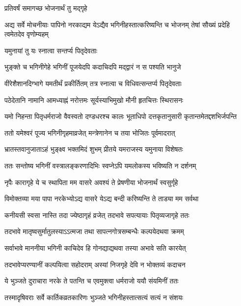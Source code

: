 
\onelineshloka
{प्रतिवर्षं समागच्छ भोजनार्थं तु मद्गृहे} %

\threelineshloka
{अद्य सर्वे मोचनीयाः पापिनो नरकाद्यम}
{येऽद्यैव भगिनीहस्तात्करिष्यन्ति च भोजनम्}
{तेषां सौख्यं प्रदेहि त्वमेतदेव वृणोम्यहम्} %



\onelineshloka
{यमुनायां तु यः स्नात्वा सन्तर्प्य पितृदेवताः} %

\twolineshloka
{भुङ्क्ते च भगिनीगेहे भगिनीं पूजयेदपि}
{कदाचिदपि मद्द्वारं न स पश्यति भानुजे} %

\twolineshloka
{वीरेशैशानदिग्भागे यमतीर्थं प्रकीर्तितम्}
{तत्र स्नात्वा च विधिवत्सन्तर्प्य पितृदेवताः} %

\twolineshloka
{पठेदेतानि नामानि आमध्याह्नं नरोत्तमः}
{सूर्यस्याभिमुखो मौनी हृतचित्तः स्थिरासनः} %

\fourlineindentedshloka
{यमो निहन्ता पितृधर्मराजो}
{वैवस्वतो दण्डधरश्च कालः}
{भूताधिपो दत्तकृतानुसारी}
{कृतान्तमेतद्दशभिर्जपन्ति} %

\twolineshloka
{ततो यमेश्वरं पूज्य भगिनीगृहमाव्रजेत्}
{मन्त्रेणानेन च तया भोजितः पूर्वमादरात्} %

\twolineshloka
{भ्रातस्तवानुजाताऽहं भुङ्क्ष्व भक्तमिदं शुभम्}
{प्रीतये यमराजस्य यमुनाया विशेषतः} %

\twolineshloka
{ततः सन्तोष्य भगिनीं वस्त्रालङ्करणादिभिः}
{स्वप्नेऽपि यमलोकस्य भविष्यति न दर्शनम्} %

\twolineshloka
{नृपैः कारागृहे ये च स्थापिता मम वासरे}
{अवश्यं ते प्रेषणीया भोजनार्थं स्वसुर्गृहे} %

\twolineshloka
{विमोक्तव्या मया पापा नरकेभ्योऽद्य वासरे}
{येऽद्य बन्दी करिष्यन्ति ते ताड्या मम सर्वथा} %

\twolineshloka
{कनीयसी स्वसा नास्ति तदा ज्येष्ठागृहं व्रजेत्}
{तदभावे सपत्यायाः पितृव्यजागृहे ततः} %

\twolineshloka
{तदभावे मातृष्वसुर्मातुलस्याऽऽत्मजा तथा}
{सापत्नगोत्रसम्बन्धैः कल्पयेदथवा क्रमम्} %

\twolineshloka
{सर्वाभावे माननीया भगिनी काचिदेव हि}
{गोनद्याद्यथवा तस्या अभावे सति कारयेत्} %

\twolineshloka
{तदभावेप्यरण्यानीं कल्पयित्वा सहोदराम्}
{अस्यां निजगृहे देवि न भोक्तव्यं कदाचन} %

\twolineshloka
{ये भुञ्जते दुराचारा नरके ते पतन्ति च}
{एवमुक्त्वा धर्मराजो ययौ संयमिनीं ततः} %

\twolineshloka
{तस्मादृषिवराः सर्वे कार्तिकव्रतकारिणः}
{भुञ्जते भगिनीहस्तात्सत्यं सत्यं न संशयः} %

